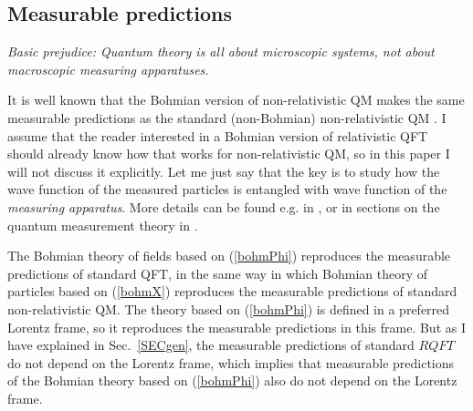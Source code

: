 \documentclass[12pt]{article}
\begin{document}
\subsection{Measurable predictions}

\begin{flushright}
{\it Basic prejudice: Quantum theory is all about microscopic systems, not 
about macroscopic measuring apparatuses.} 
\end{flushright}

It is well known that the Bohmian version of non-relativistic QM makes the same measurable predictions 
as the standard (non-Bohmian) non-relativistic QM \cite{bohm,book-bohm,book-hol,book-durr,oriols}. 
I assume that the reader interested in a Bohmian version of relativistic QFT should already know
how that works for non-relativistic QM, so in this paper I will not discuss it explicitly.
Let me just say that the key is to study how the wave function of the measured particles
is entangled with wave function of the {\em measuring apparatus}. More details 
can be found e.g. in \cite{nikIBM}, or in sections on the quantum measurement theory in 
\cite{bohm,book-bohm,book-hol,book-durr,oriols}. 

The Bohmian theory of fields based on (\ref{bohmPhi}) reproduces the measurable predictions of standard QFT,
in the same way in which Bohmian theory of particles based on (\ref{bohmX}) reproduces the measurable predictions 
of standard non-relativistic QM.  
The theory based on (\ref{bohmPhi}) is defined in a preferred Lorentz frame,
so it reproduces the measurable predictions in this frame. But as I have explained in Sec.~\ref{SECgen},
the measurable predictions of standard $RQFT$ do not depend on the Lorentz frame, which implies that 
measurable predictions of the Bohmian theory based on (\ref{bohmPhi}) also do not depend on the Lorentz frame.
\end{document}
